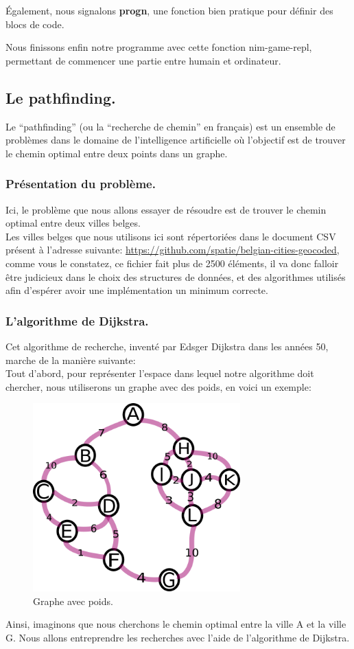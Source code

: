 \documentclass[a4paper, 12pt]{article}
\numberwithin{equation}{subsection}
\begin{document}
Également, nous signalons {\bf progn}, une fonction bien pratique pour définir des blocs de code.

Nous finissons enfin notre programme avec cette fonction nim-game-repl, permettant de commencer une partie entre humain et ordinateur.
\subsection{Le pathfinding.}
Le ``pathfinding'' (ou la ``recherche de chemin'' en français) est un ensemble de problèmes dans le domaine de l'intelligence artificielle où l'objectif est de trouver le chemin optimal entre deux points dans un graphe. \\
\subsubsection{Présentation du problème.}
Ici, le problème que nous allons essayer de résoudre est de trouver le chemin optimal entre deux villes belges. \\

Les villes belges que nous utilisons ici sont répertoriées dans le document CSV présent à l'adresse suivante: \url{https://github.com/spatie/belgian-cities-geocoded},
comme vous le constatez, ce fichier fait plus de 2500 éléments, il va donc falloir être judicieux dans le choix des structures de données, et des algorithmes utilisés afin d'espérer avoir une implémentation un minimum correcte. \\[0.2cm]
\subsubsection{L'algorithme de Dijkstra.}
Cet algorithme de recherche, inventé par Edsger Dijkstra dans les années 50, marche de la manière suivante: \\

Tout d'abord, pour représenter l'espace dans lequel notre algorithme doit chercher, nous utiliserons un graphe avec des poids, en voici un exemple: \\
\begin{figure}[H]
  \centering
  \includegraphics[width=8.0cm]{imgs/numbered_graph.png}
  \caption{Graphe avec poids.}
\end{figure}
Ainsi, imaginons que nous cherchons le chemin optimal entre la ville A et la ville G. Nous allons entreprendre les recherches avec l'aide de l'algorithme de Dijkstra. \\
\end{document}
